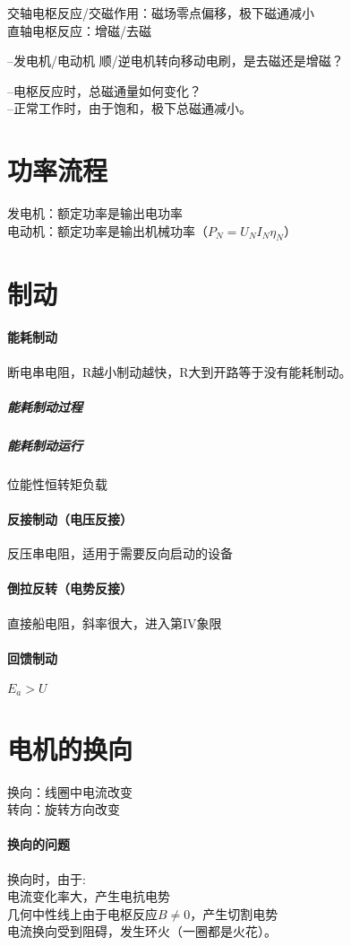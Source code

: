\documentclass{book}
\begin{document}
    交轴电枢反应/交磁作用：磁场零点偏移，极下磁通减小\\
    直轴电枢反应：增磁/去磁

    --发电机/电动机 顺/逆电机转向移动电刷，是去磁还是增磁？


    --电枢反应时，总磁通量如何变化？\\
    --正常工作时，由于饱和，极下总磁通减小。
    \section{功率流程}
    发电机：额定功率是输出电功率\\
    电动机：额定功率是输出机械功率（$P_{N}=U_{N} I_{N} \eta_{N}$）


    \section{制动}

    \paragraph{能耗制动}
    断电串电阻，R越小制动越快，R大到开路等于没有能耗制动。
    \subparagraph*{能耗制动过程}
    \subparagraph*{能耗制动运行}位能性恒转矩负载

    \paragraph{反接制动（电压反接）}反压串电阻，适用于需要反向启动的设备

    \paragraph{倒拉反转（电势反接）}直接船电阻，斜率很大，进入第IV象限

    \paragraph{回馈制动}$E_{a}>U$


    \section{电机的换向}
    换向：线圈中电流改变\\
    转向：旋转方向改变

    \paragraph{换向的问题}
    换向时，由于:\\
    电流变化率大，产生电抗电势\\
    几何中性线上由于电枢反应$B\neq0$，产生切割电势\\
    电流换向受到阻碍，发生环火（一圈都是火花）。
\end{document}
